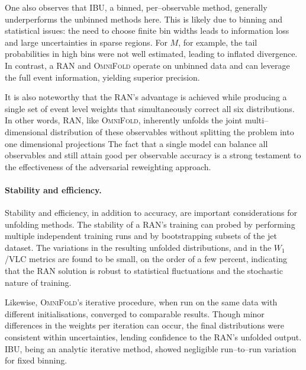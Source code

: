 {{            One also observes that IBU, a binned, per--observable method, generally underperforms the unbinned methods here.
            This is likely due to binning and statistical issues: the need to choose finite bin widths leads to information loss and large uncertainties in sparse regions.
            For $M$, for example, the tail probabilities in high bins were not well estimated, leading to inflated divergence.
            In contrast, a RAN and \textsc{OmniFold} operate on unbinned data and can leverage the full event information, yielding superior precision.
            
            It is also noteworthy that the RAN’s advantage is achieved while producing a single set of event level weights that simultaneously correct all six distributions.
            In other words, RAN, like \textsc{OmniFold}, inherently unfolds the joint multi--dimensional distribution of these observables without splitting the problem into one dimensional projections
            The fact that a single model can balance all observables and still attain good per observable accuracy is a strong testament to the effectiveness of the adversarial reweighting approach.

            \paragraph{Stability and efficiency.}
            
            Stability and efficiency, in addition to accuracy, are important considerations for unfolding methods.
            The stability of a RAN's training can probed by performing multiple independent training runs and by bootstrapping subsets of the jet dataset.
            The variations in the resulting unfolded distributions, and in the $W_1$/VLC metrics are found to be small, on the order of a few percent, indicating that the RAN solution is robust to statistical fluctuations and the stochastic nature of training.
            
            Likewise, \textsc{OmniFold}’s iterative procedure, when run on the same data with different initialisations, converged to comparable results.
            Though minor differences in the weights per iteration can occur, the final distributions were consistent within uncertainties, lending confidence to the RAN's unfolded output.
            IBU, being an analytic iterative method, showed negligible run--to--run variation for fixed binning.
            
}}
